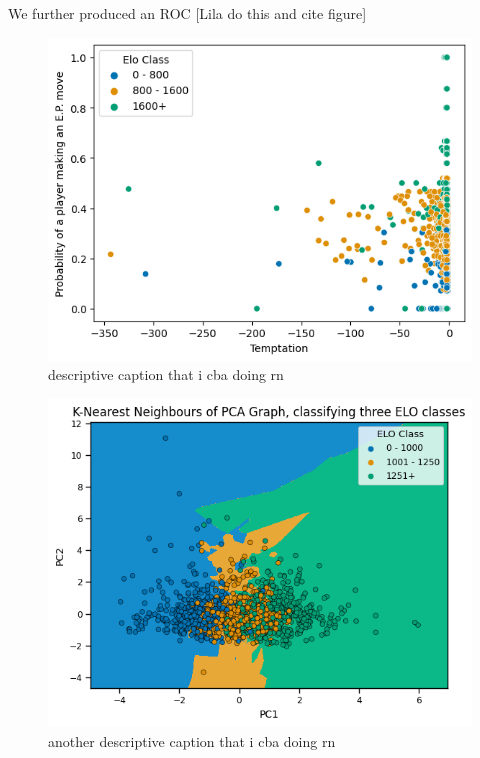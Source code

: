 \documentclass[10pt,a4paper,twocolumn]{article}
\begin{document}
We further produced an ROC [Lila do this and cite figure]




\begin{figure}[t]
  \centering
  \includegraphics{report/images/temptation_chart.png}
  \caption{descriptive caption that i cba doing rn}
  \label{fds-project-template:fig:temptation}
\end{figure}

\begin{figure}[t]
  \centering
  \includegraphics{report/images/knn_graph.png}
  \caption{another descriptive caption that i cba doing rn}
  \label{fds-project-template:fig:knn}
\end{figure}
\end{document}
